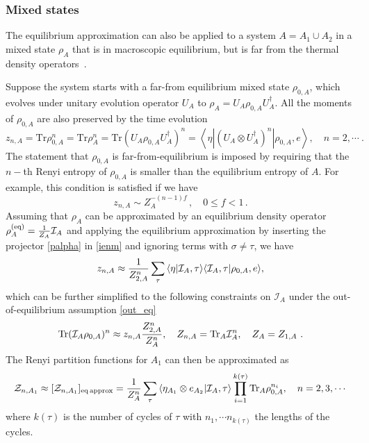 \documentclass[a4paper,11pt]{article}
\newcommand\vev[1]{{\ensuremath{\left\langle{#1}\right\rangle}}}
\newcommand{\be}{\begin{equation}}
\newcommand{\ee}{\end{equation}}
\newcommand\al{{\alpha}}
\newcommand\da{{\dagger}}
\newcommand\ov{\over}
\newcommand\sI{{\ensuremath{{\mathcal I}}}}
\newcommand\sZ{{\mathcal Z}}
\newcommand{\Tr}{\text{Tr}}
\begin{document}
\subsubsection{Mixed states} \label{sec:mixed}


The equilibrium approximation can also be applied to a system $A = A_1 \cup A_2$ in a mixed state $\rho_A$ that is in macroscopic equilibrium, but is far from the thermal density operators~\cite{2020arXiv200801089L}. %




Suppose the system starts with a far-from equilibrium mixed state $\rho_{0, A}$, which evolves under unitary evolution operator $U_A$ to $\rho_A = U_A \rho_{0, A} U^\da_A $. 
All the moments of $\rho_{0,A}$ are also preserved by the time evolution 
\be \label{ienm}
z_{n, A} = \Tr \rho_{0,A}^n = \Tr \rho^n_A = \Tr (U_A \rho_{0,A} U_A^\da)^n = \vev{\eta|(U_A \otimes U^{\da}_A)^n| \rho_{0,A},e}, \quad n=2, \cdots \ .
\ee
The statement that $\rho_{0, A} $ is far-from-equilibrium is imposed by requiring that the $n-$th Renyi entropy of $\rho_{0, A}$ is smaller than the equilibrium entropy of $A$. For example, this condition is satisfied if we have
\be 
z_{n,A} \sim Z_A^{-(n-1)f}\, , \quad 0 \leq f < 1 \, . \label{out_eq}
\ee
Assuming that $\rho_A$ can be approximated by an equilibrium density operator $\rho^{(\rm eq)}_A = {1 \ov Z_A} \sI_A $ 
and applying the equilibrium approximation by inserting the projector \eqref{palpha} in \eqref{ienm} and ignoring terms with $\sigma \neq \tau$, we have 
\be 
z_{n,A} \approx {1 \ov Z_{2,A}^n} \sum_\tau \vev{\eta|\sI_A , \tau} \vev{\sI_A, \tau| \rho_{0,A}, e} , 
\ee 
which can be further simplified to the following constraints on $\sI_A$ under the out-of-equilibrium assumption \eqref{out_eq}
\be \label{elk}
\Tr (\sI_A \rho_{0,A})^n \approx z_{n,A} {Z_{2,A}^n \ov Z_A^n} , \quad Z_{n, A} = \Tr_A \sI_A^n , \quad Z_A = Z_{1,A} \ .
\ee
The Renyi partition functions for $A_1$ can then be approximated as 
 \be\label{for11}
\sZ_{n, A_1} \approx [\sZ_{n, A_1} ]_{\rm eq \, approx} 
= {1 \ov Z_A^n} \sum_{\tau} \vev{\eta_{A_1} \otimes e_{A_2} | \sI_A , \tau} \prod_{i=1}^{k (\tau)} \Tr_A \rho_{0,A}^{n_i} 
, %
\quad n=2,3, \cdots 
\ee
where $k (\tau)$ is the number of cycles of $\tau$ with $n_1, \cdots n_{k (\tau)}$ the lengths of the cycles. 
\end{document}
